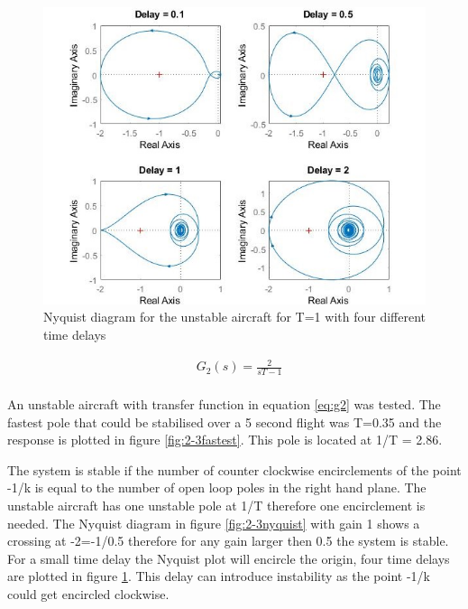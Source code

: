 \documentclass[twoside,twocolumn]{article}
\begin{document}
\begin{figure}[h]
  \centering
    \includegraphics[width=\linewidth]{2-3_nyquist2}
  \caption{Nyquist diagram for the unstable aircraft for T=1 with four different time delays}
  \label{fig:2-3nyquist2}
\end{figure}

\begin{equation}
\label{eq:g2}
\begin{split}
&G_2(s) = \frac{2}{sT-1}\\
\end{split}
\end{equation}


An unstable aircraft with transfer function in equation \ref{eq:g2} was tested. The fastest pole that could be stabilised over a 5 second flight was T=0.35 and the response is plotted in figure \ref{fig:2-3fastest}. This pole is located at 1/T = 2.86.


The system is stable if the number of counter clockwise encirclements of the point -1/k is equal to the number of open loop poles in the right hand plane. The unstable aircraft has one unstable pole at 1/T therefore one encirclement is needed. The Nyquist diagram in figure \ref{fig:2-3nyquist} with gain 1 shows a crossing at -2=-1/0.5 therefore for any gain larger then 0.5 the system is stable. For a small time delay the Nyquist plot will encircle the origin, four time delays are plotted in figure \ref{fig:2-3nyquist2}. This delay can introduce instability as the point -1/k could get encircled clockwise.
\end{document}
